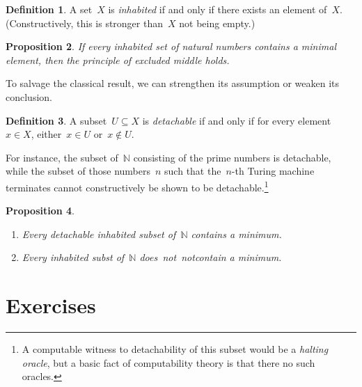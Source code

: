 \documentclass[10pt,reqno,a4paper,openany]{amsbook}
\theoremstyle{definition}
\newtheorem{defn}{Definition}[chapter]
\theoremstyle{plain}
\newtheorem{prop}[defn]{Proposition}
\theoremstyle{remark}
\newcommand{\NN}{\mathbb{N}}
\newcommand{\?}{\,{:}\,}
\renewcommand{\_}{\mathpunct{.}\,}
\newcommand{\notnot}{\emph{not~not}}
\begin{document}
\begin{defn}A set~$X$ is \emph{inhabited} if and only if there exists an
element of~$X$. (Constructively, this is stronger than~$X$ not being
empty.)\end{defn}

\begin{prop}If every inhabited set of natural numbers contains a minimal
element, then the principle of excluded middle holds.\end{prop}

To salvage the classical result, we can strengthen its assumption or weaken its
conclusion.

\begin{defn}A subset~$U \subseteq X$ is \emph{detachable} if and only if for
every element~$x \in X$, either~$x \in U$ or~$x \not\in U$.\end{defn}

For instance, the subset of~$\NN$ consisting of the prime numbers is detachable,
while the subset of those numbers~$n$ such that the~$n$-th Turing machine
terminates cannot constructively be shown to be detachable.\footnote{A
computable witness to detachability of this subset would be a \emph{halting
oracle}, but a basic fact of computability theory is that there no such
oracles.}

\begin{prop}\label{prop:minima}\begin{enumerate}
\item Every detachable inhabited subset of~$\NN$ contains a minimum.
\item Every inhabited subst of~$\NN$ does~\notnot contain a minimum.
\end{enumerate}
\end{prop}


\section{Exercises}
\end{document}
